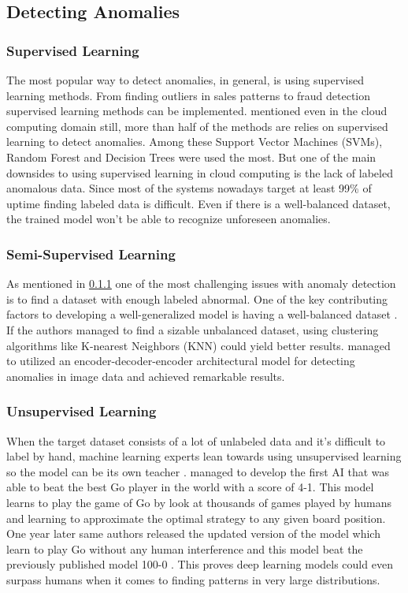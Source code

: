 \subsection{Detecting Anomalies}

\subsubsection{Supervised Learning}\label{sec:approch-supervised}
The most popular way to detect anomalies, in general, is using supervised learning methods. From finding outliers in sales patterns to fraud detection supervised learning methods can be implemented. \cite{du2018anomaly} mentioned even in the cloud computing domain still, more than half of the methods are relies on supervised learning to detect anomalies. Among these Support Vector Machines (SVMs), Random Forest and Decision Trees were used the most. But one of the main downsides to using supervised learning in cloud computing is the lack of labeled anomalous data. Since most of the systems nowadays target at least 99\% of uptime finding labeled data is difficult. Even if there is a well-balanced dataset, the trained model won't be able to recognize unforeseen anomalies.

\subsubsection{Semi-Supervised Learning}

As mentioned in \ref{sec:approch-supervised} one of the most challenging issues with anomaly detection is to find a dataset with enough labeled abnormal. One of the key contributing factors to developing a well-generalized model is having a well-balanced dataset \citep{batista2004study}. If the authors managed to find a sizable unbalanced dataset, using clustering algorithms like K-nearest Neighbors (KNN) could yield better results. \cite{akcay2018ganomaly} managed to utilized an encoder-decoder-encoder architectural model for detecting anomalies in image data and achieved remarkable results. 

\subsubsection{Unsupervised Learning}

When the target dataset consists of a lot of unlabeled data and it's difficult to label by hand, machine learning experts lean towards using unsupervised learning so the model can be its own teacher \citep{Unsuperv29:online}. \cite{silver2016mastering} managed to develop the first AI that was able to beat the best Go player in the world with a score of 4-1. This model learns to play the game of Go by look at thousands of games played by humans and learning to approximate the optimal strategy to any given board position. One year later same authors released the updated version of the model which learn to play Go without any human interference and this model beat the previously published model 100-0 \citep{silver2017mastering}. This proves deep learning models could even surpass humans when it comes to finding patterns in very large distributions. 

